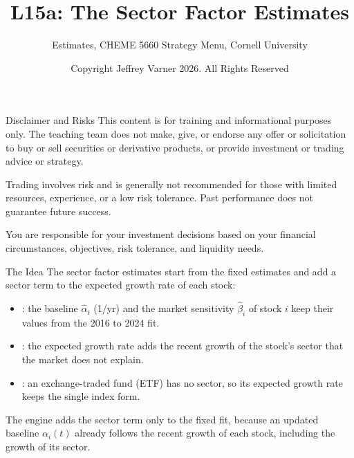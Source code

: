 \documentclass[aspectratio=169,11pt]{beamer}
\title{\texorpdfstring{{\vnheavy L15a}}{L15a}: The Sector Factor Estimates}
\subtitle{Estimates, CHEME 5660 Strategy Menu, Cornell University}
\author{Copyright Jeffrey Varner 2026. All Rights Reserved}
\begin{document}
\vntitlepage

\begin{frame}{Disclaimer and Risks}
  \vspace{0.6em}
  \textbf{} This content is for training and informational
  purposes only. The teaching team does not make, give, or endorse any offer or
  solicitation to buy or sell securities or derivative products, or provide
  investment or trading advice or strategy.

  \vspace{1.1em}
  \textbf{} Trading involves risk and is generally not recommended for
  those with limited resources, experience, or a low risk tolerance. Past
  performance does not guarantee future success.

  \vspace{1.1em}
  \textbf{} You are responsible for your investment decisions
  based on your financial circumstances, objectives, risk tolerance, and
  liquidity needs.
\end{frame}

\begin{frame}{The Idea}
  \vspace{0.3em}
  The sector factor estimates start from the fixed estimates and add a sector term to the expected growth rate of
  each stock:
  \begin{itemize}\setlength{\itemsep}{0.5em}
    \item {}: the baseline $\hat{\alpha}_{i}$ (1/yr) and the market sensitivity $\hat{\beta}_{i}$ of
      stock $i$ keep their values from the 2016 to 2024 fit.
    \item {}: the expected growth rate adds the recent growth of the stock's sector that the
      market does not explain.
    \item {}: an exchange-traded fund (ETF) has no sector, so its expected growth rate keeps the single
      index form.
  \end{itemize}

  \vspace{0.5em}
  The engine adds the sector term only to the fixed fit, because an updated baseline $\alpha_{i}(t)$ already
  follows the recent growth of each stock, including the growth of its sector.
\end{frame}
\end{document}
